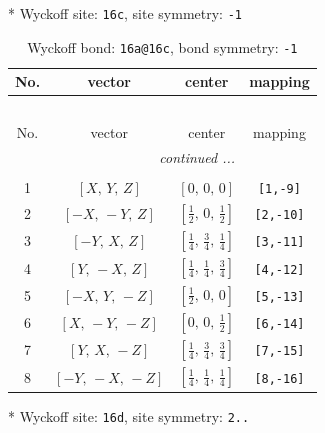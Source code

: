 \documentclass[fleqn,8pt]{jsarticle}
\begin{document}
* Wyckoff site: {\tt 16c}, site symmetry: {\tt -1}
\renewcommand{\arraystretch}{1.2}
\begin{longtable}{cccc}
\caption{Wyckoff bond: {\tt 16a@16c}, bond symmetry: {\tt -1}}
 \\
 \hline \hline
No. & vector & center & mapping \\ \hline \endfirsthead

\multicolumn{3}{l}{\tablename\ \thetable{}} \\
 \hline \hline
No. & vector & center & mapping \\ \hline \endhead

 \hline \hline
\multicolumn{3}{r}{\footnotesize\it continued ...} \\ \endfoot

 \hline \hline
\multicolumn{3}{r}{} \\ \endlastfoot

1 & $\left[ X,\, Y,\, Z \right]$ & $\left[ 0,\, 0,\, 0 \right]$ & {\tt [1,-9]} \\ \hline
2 & $\left[ - X,\, - Y,\, Z \right]$ & $\left[ \frac{1}{2},\, 0,\, \frac{1}{2} \right]$ & {\tt [2,-10]} \\ \hline
3 & $\left[ - Y,\, X,\, Z \right]$ & $\left[ \frac{1}{4},\, \frac{3}{4},\, \frac{1}{4} \right]$ & {\tt [3,-11]} \\ \hline
4 & $\left[ Y,\, - X,\, Z \right]$ & $\left[ \frac{1}{4},\, \frac{1}{4},\, \frac{3}{4} \right]$ & {\tt [4,-12]} \\ \hline
5 & $\left[ - X,\, Y,\, - Z \right]$ & $\left[ \frac{1}{2},\, 0,\, 0 \right]$ & {\tt [5,-13]} \\ \hline
6 & $\left[ X,\, - Y,\, - Z \right]$ & $\left[ 0,\, 0,\, \frac{1}{2} \right]$ & {\tt [6,-14]} \\ \hline
7 & $\left[ Y,\, X,\, - Z \right]$ & $\left[ \frac{1}{4},\, \frac{3}{4},\, \frac{3}{4} \right]$ & {\tt [7,-15]} \\ \hline
8 & $\left[ - Y,\, - X,\, - Z \right]$ & $\left[ \frac{1}{4},\, \frac{1}{4},\, \frac{1}{4} \right]$ & {\tt [8,-16]} \\
\end{longtable}
* Wyckoff site: {\tt 16d}, site symmetry: {\tt 2..}
\renewcommand{\arraystretch}{1.2}
\end{document}
